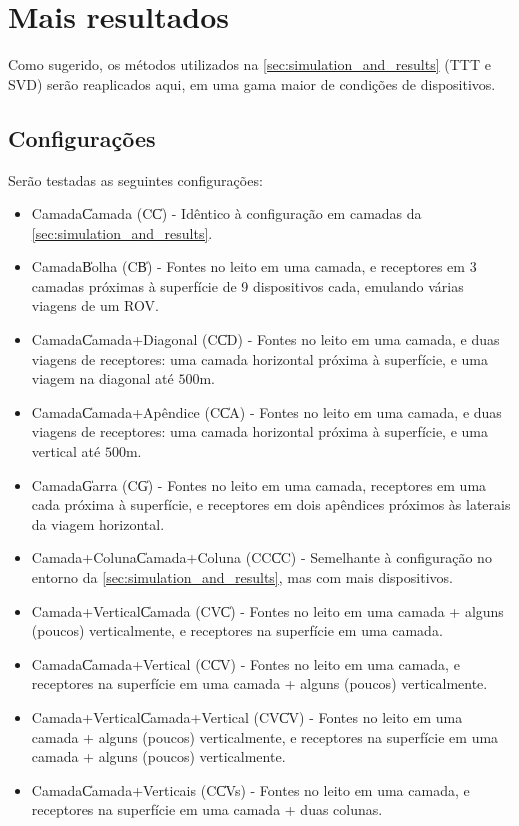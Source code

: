 \section{Mais resultados}

Como sugerido, os métodos utilizados na \cref{sec:simulation_and_results} (TTT e SVD) serão reaplicados aqui, em uma gama maior de condições de dispositivos.

\subsection{Configurações}

Serão testadas as seguintes configurações:

\begin{itemize}
	\item Camada\|Camada (C\|C) - Idêntico à configuração em camadas da \cref{sec:simulation_and_results}.
	\item Camada\|Bolha (C\|B) - Fontes no leito em uma camada, e receptores em 3 camadas próximas à superfície de 9 dispositivos cada, emulando várias viagens de um ROV.
	\item Camada\|Camada+Diagonal (C\|CD) - Fontes no leito em uma camada, e duas viagens de receptores: uma camada horizontal próxima à superfície, e uma viagem na diagonal até $500\si{\meter}$.
	\item Camada\|Camada+Apêndice (C\|CA) - Fontes no leito em uma camada, e duas viagens de receptores: uma camada horizontal próxima à superfície, e uma vertical até $500\si{\meter}$.
	\item Camada\|Garra (C\|G) - Fontes no leito em uma camada, receptores em uma cada próxima à superfície, e receptores em dois apêndices próximos às laterais da viagem horizontal.
	
	\item Camada+Coluna\|Camada+Coluna (CC\|CC) - Semelhante à configuração no entorno da \cref{sec:simulation_and_results}, mas com mais dispositivos.
	\item Camada+Vertical\|Camada (CV\|C) - Fontes no leito em uma camada + alguns (poucos) verticalmente, e receptores na superfície em uma camada.
	\item Camada\|Camada+Vertical (C\|CV) - Fontes no leito em uma camada, e receptores na superfície em uma camada + alguns (poucos) verticalmente.
	\item Camada+Vertical\|Camada+Vertical (CV\|CV) - Fontes no leito em uma camada + alguns (poucos) verticalmente, e receptores na superfície em uma camada + alguns (poucos) verticalmente.
	\item Camada\|Camada+Verticais (C\|CVs) - Fontes no leito em uma camada, e receptores na superfície em uma camada + duas colunas.
\end{itemize}

